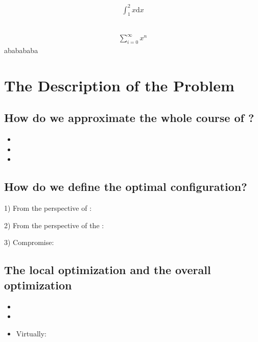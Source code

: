 \documentclass{apmcmthesis}
\begin{document}
\begin{align*}
  \int^2_1 x \mathrm{d} x
\end{align*}

\subsection{}
\begin{align}
  \sum_{i=0}^\infty x^n
\end{align}
ababababa
\subsection{}



\subsection{}


\section{The Description of the Problem}
\subsection{How do we approximate the whole course of ?}

\begin{itemize}
  \item
  \item
  \item
\end{itemize}


\subsection{How do we define the optimal configuration?}
1) From the perspective of      :\par
2) From the perspective of the      :\par
3) Compromise:

\subsection{The local optimization and the overall optimization}


\begin{itemize}
  \item
  \item
  \item Virtually:
\end{itemize}
\end{document}
